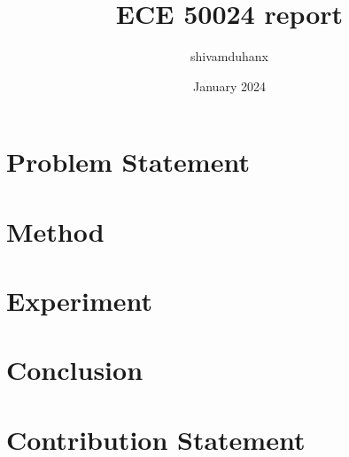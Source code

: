 \documentclass{article}
\title{ECE 50024 report}
\author{shivamduhanx }
\date{January 2024}
\begin{document}
\maketitle

\section{Problem Statement}

\section{Method}

\section{Experiment}

\section{Conclusion}

\section{Contribution Statement}
\end{document}
